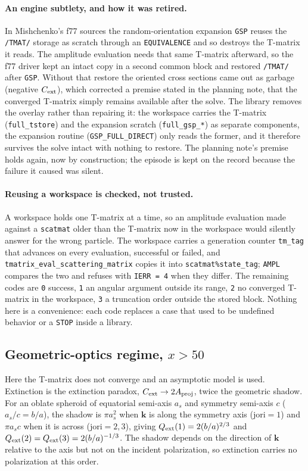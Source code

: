 \documentclass{my_memo}
\newcommand{\code}[1]{\texttt{#1}}
\begin{document}
\paragraph{An engine subtlety, and how it was retired.} In Mishchenko's f77
sources the random-orientation expansion \code{GSP} reuses the \code{/TMAT/}
storage as scratch through an \code{EQUIVALENCE} and so destroys the T-matrix it
reads. The amplitude evaluation needs that same T-matrix afterward, so the f77
driver kept an intact copy in a second common block and restored \code{/TMAT/}
after \code{GSP}. Without that restore the oriented cross sections came out as
garbage (negative $C_{\rm ext}$), which corrected a premise stated in the
planning note, that the converged T-matrix simply remains available after the
solve. The library removes the overlay rather than repairing it: the workspace
carries the T-matrix (\code{full\_tstore}) and the expansion scratch
(\code{full\_gsp\_*}) as separate components, the expansion routine
(\code{GSP\_FULL\_DIRECT}) only reads the former, and it therefore survives the
solve intact with nothing to restore.
The planning note's premise holds again, now by construction; the episode is
kept on the record because the failure it caused was silent.

\paragraph{Reusing a workspace is checked, not trusted.} A workspace holds one
T-matrix at a time, so an amplitude evaluation made against a \code{scatmat}
older than the T-matrix now in the workspace would silently answer for the wrong
particle. The workspace carries a generation counter \code{tm\_tag} that advances
on every evaluation, successful or failed, and
\code{tmatrix\_eval\_scattering\_matrix} copies it into
\code{scatmat\%state\_tag}; \code{AMPL} compares the two and refuses with
\code{IERR = 4} when they differ. The remaining codes are \code{0} success,
\code{1} an angular argument outside its range, \code{2} no converged T-matrix in
the workspace, \code{3} a truncation order outside the stored block. Nothing here
is a convenience: each code replaces a case that used to be undefined behavior or
a \code{STOP} inside a library.

\subsection{Geometric-optics regime, $x>50$}

Here the T-matrix does not converge and an asymptotic model is used. Extinction
is the extinction paradox, $C_{\rm ext}\to 2A_{\rm proj}$, twice the geometric
shadow. For an oblate spheroid of equatorial semi-axis $a_s$ and symmetry
semi-axis $c$ ($a_s/c=b/a$), the shadow is $\pi a_s^2$ when $\mathbf{k}$ is along
the symmetry axis ($\mathrm{jori}=1$) and $\pi a_s c$ when it is across
($\mathrm{jori}=2,3$), giving $Q_{\rm ext}(1)=2(b/a)^{2/3}$ and
$Q_{\rm ext}(2)=Q_{\rm ext}(3)=2(b/a)^{-1/3}$. The shadow depends on the
direction of $\mathbf{k}$ relative to the axis but not on the incident
polarization, so extinction carries no polarization at this order.
\end{document}
